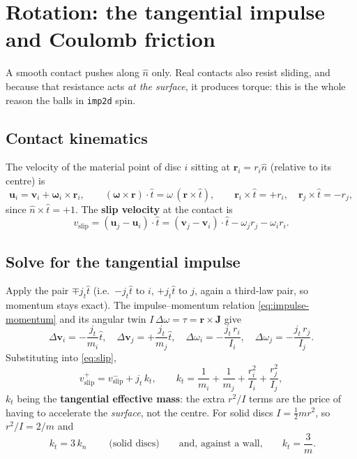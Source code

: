 \documentclass[a4paper,11pt]{article}
\newcommand{\vV}{\bm{v}}
\newcommand{\Jimp}{\bm{J}}
\newcommand{\hh}{\hat{n}}
\newcommand{\ttt}{\hat{t}}
\newcommand{\rr}{\bm{r}}          %
\begin{document}
\section{Rotation: the tangential impulse and Coulomb friction}

A smooth contact pushes along $\hh$ only. Real contacts also resist sliding, and
because that resistance acts \emph{at the surface}, it produces torque: this is
the whole reason the balls in \texttt{imp2d} spin.

\subsection{Contact kinematics}
The velocity of the material point of disc $i$ sitting at $\rr_i=r_i\hh$
(relative to its centre) is
\begin{equation}
  \bm u_i=\vV_i+\bm\omega_i\times\rr_i,
  \qquad
  (\bm\omega\times\rr)\cdot\ttt=\omega\,(\rr\times\ttt),
  \qquad
  \rr_i\times\ttt=+r_i,\quad \rr_j\times\ttt=-r_j ,
\end{equation}
since $\hh\times\ttt=+1$. The \textbf{slip velocity} at the contact is
\begin{equation}
  v_{\text{slip}}=(\bm u_j-\bm u_i)\cdot\ttt
   =(\vV_j-\vV_i)\cdot\ttt-\omega_j r_j-\omega_i r_i .
  \label{eq:slip}
\end{equation}

\subsection{Solve for the tangential impulse}
Apply the pair $\mp j_t\ttt$ (i.e.\ $-j_t\ttt$ to $i$, $+j_t\ttt$ to $j$, again a
third-law pair, so momentum stays exact). The impulse--momentum relation
\eqref{eq:impulse-momentum} and its angular twin $I\,\Delta\omega=\tau=\rr\times\Jimp$
give
\begin{equation}
  \Delta\vV_i=-\frac{j_t}{m_i}\ttt,\quad
  \Delta\vV_j=+\frac{j_t}{m_j}\ttt,\quad
  \Delta\omega_i=-\frac{j_t\,r_i}{I_i},\quad
  \Delta\omega_j=-\frac{j_t\,r_j}{I_j}.
  \label{eq:tangential-applied}
\end{equation}
Substituting into \eqref{eq:slip},
\begin{equation}
  v_{\text{slip}}^{+}=v_{\text{slip}}^{-}+j_t\,k_t,
  \qquad
  k_t=\frac{1}{m_i}+\frac{1}{m_j}+\frac{r_i^{2}}{I_i}+\frac{r_j^{2}}{I_j},
  \label{eq:kt}
\end{equation}
$k_t$ being the \textbf{tangential effective mass}: the extra $r^2/I$ terms are
the price of having to accelerate the \emph{surface}, not the centre. For solid
discs $I=\tfrac12mr^2$, so $r^2/I=2/m$ and
\begin{equation}
  \boxed{\;k_t=3\,k_n\;}\qquad\text{(solid discs)}
  \qquad\text{and, against a wall,}\qquad k_t=\frac{3}{m}.
  \label{eq:kt3}
\end{equation}
\end{document}
